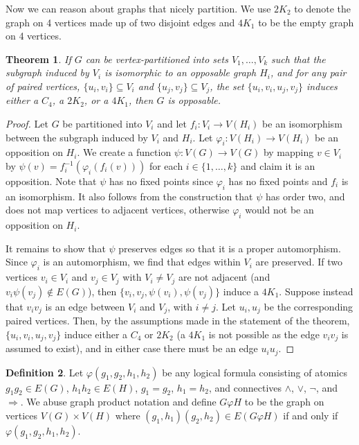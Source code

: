 \documentclass[11pt]{article}
\newtheorem{theorem}{Theorem}[section]
\theoremstyle{definition}
\newtheorem{definition}[theorem]{Definition}
\begin{document}
Now we can reason about graphs that nicely partition. We use $2K_2$ to denote
the graph on 4 vertices made up of two disjoint edges and $4K_1$ to be the
empty graph on 4 vertices.

\begin{theorem}
    \label{thm: decomposition?}
    If $G$ can be vertex-partitioned into sets $V_1,\dots, V_{k}$ such that the
    subgraph induced by $V_i$ is isomorphic to an opposable graph $H_i$, and
    for any pair of paired vertices, $\{u_i,v_i\}\subseteq V_i$ and
    $\{u_j,v_j\}\subseteq V_j$, the set $\{u_i, v_i, u_j, v_j\}$ induces either
    a $C_4$, a $2K_2$, or a $4K_1$, then $G$ is opposable.
\end{theorem}

\begin{proof}
    Let $G$ be partitioned into $V_i$ and let $f_i:V_i\rightarrow V(H_i)$ be an
    isomorphism between the subgraph induced by $V_i$ and $H_i$. Let
    $\varphi_i:V(H_i)\rightarrow V(H_i)$ be an opposition on $H_i$. We create a
    function $\psi:V(G)\rightarrow V(G)$ by mapping $v\in V_i$ by
    $\psi(v)=f_i^{-1}(\varphi_i(f_i(v)))$ for each $i\in \{1,\dots, k\}$ and
    claim it is an opposition. Note that $\psi$ has no fixed points since
    $\varphi_i$ has no fixed points and $f_i$ is an isomorphism. It also
    follows from the construction that $\psi$ has order two, and does not map
    vertices to adjacent vertices, otherwise $\varphi_i$ would not be an
    opposition on $H_i$.

    It remains to show that $\psi$ preserves edges so that it is a proper
    automorphism. Since $\varphi_i$ is an automorphism, we find that edges
    within $V_i$ are preserved. If two vertices $v_i \in V_i$ and $v_j \in V_j$
    with $V_i \neq V_j$ are not adjacent (and $v_i\psi(v_j)\not\in E(G)$), then
    $\{v_i, v_j, \psi(v_i), \psi(v_j)\}$ induce a $4K_1$. Suppose instead that
    $v_iv_j$ is an edge between $V_i$ and $V_j$, with $i \neq j$. Let $u_i,u_j$
    be the corresponding paired vertices. Then, by the assumptions made in the
    statement of the theorem, $\{u_i,v_i,u_j,v_j\}$ induce either a $C_4$ or
    $2K_2$ (a $4K_1$ is not possible as the edge $v_iv_j$ is assumed to exist),
    and in either case there must be an edge $u_iu_j$.
\end{proof}

\begin{definition}
    Let $\varphi(g_1,g_2,h_1,h_2)$ be any logical formula consisting of atomics
    $g_1g_2\in E(G)$, $h_1h_2\in E(H)$, $g_1=g_2$, $h_1=h_2$, and connectives
    $\wedge$, $\vee$, $\neg$, and $\Rightarrow$. We abuse graph product
    notation and define $G\varphi H$ to be the graph on vertices $V(G)\times
    V(H)$ where $(g_1,h_1)(g_2,h_2)\in E(G\varphi H)$ if and only if
    $\varphi(g_1,g_2,h_1,h_2)$.
\end{definition}
\end{document}
